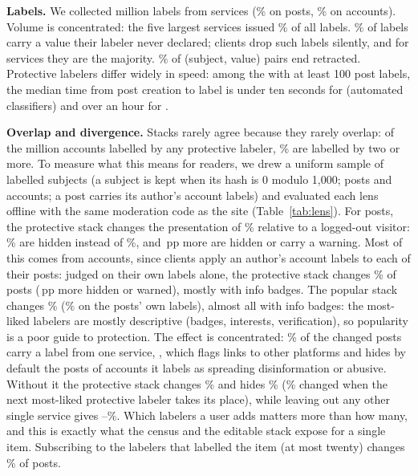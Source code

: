 \textbf{Labels.} We collected \labLabelsM million labels from \labCollected services (\labPostPct\% on posts, \labAccountPct\% on accounts). Volume is concentrated: the five largest services issued \labTopFivePct\% of all labels. \labInertPct\% of labels carry a value their labeler never declared; clients drop such labels silently, and for \labInertMajority services they are the majority. \labRetractedPct\% of (subject, value) pairs end retracted. Protective labelers differ widely in speed: among the \latN with at least 100 post labels, the median time from post creation to label is under ten seconds for \latFastN (automated classifiers) and over an hour for \latSlowN.

\textbf{Overlap and divergence.} Stacks rarely agree because they rarely overlap: of the \accProtM million accounts labelled by any protective labeler, \accTwoPlusPct\% are labelled by two or more. To measure what this means for readers, we drew a uniform sample of labelled subjects (a subject is kept when its hash is 0 modulo 1{,}000; \lensPostN posts and \lensAcctN accounts; a post carries its author's account labels) and evaluated each lens offline with the same moderation code as the site (Table~\ref{tab:lens}). For posts, the protective stack changes the presentation of \lensPostProtDiffPct\% relative to a logged-out visitor: \lensPostProtHiddenPct\% are hidden instead of \lensPostPublicHiddenPct\%, and \lensPostProtHardDiffPct\,pp more are hidden or carry a warning. Most of this comes from accounts, since clients apply an author's account labels to each of their posts: judged on their own labels alone, the protective stack changes \lensPostProtPostOnlyDiffPct\% of posts (\lensPostProtPostOnlyHardPct\,pp more hidden or warned), mostly with info badges. The popular stack changes \lensPostPopDiffPct\% (\lensPostPopPostOnlyDiffPct\% on the posts' own labels), almost all with info badges: the most-liked labelers are mostly descriptive (badges, interests, verification), so popularity is a poor guide to protection. The effect is concentrated: \lensTopDriverPct\% of the changed posts carry a label from one service, \texttt{\lensTopDriver}, which flags links to other platforms and hides by default the posts of accounts it labels as spreading disinformation or abusive. Without it the protective stack changes \lensPostProtNoTopDiffPct\% and hides \lensPostNoTopHiddenPct\% (\lensPostProtSwapTopDiffPct\% changed when the next most-liked protective labeler takes its place), while leaving out any other single service gives \lensPostLooMinPct--\lensPostLooMaxPct\%. Which labelers a user adds matters more than how many, and this is exactly what the census and the editable stack expose for a single item. Subscribing to the labelers that labelled the item (at most twenty) changes \lensPostAllDiffPct\% of posts.

